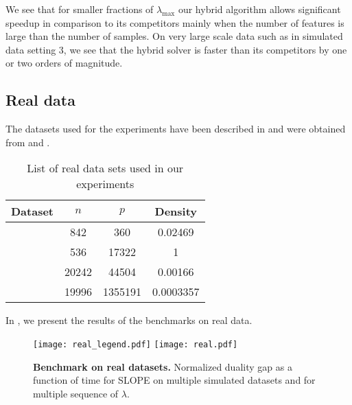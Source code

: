 We see that for smaller fractions of $\lambda_{\text{max}}$ our hybrid algorithm allows significant speedup in comparison to its competitors mainly when the number of features is large than the number of samples.
On very large scale data such as in simulated data setting $3$, we see that the hybrid solver is faster than its competitors by one or two orders of magnitude.

\subsection{Real data}
\label{sec:experiments-real-data}

The datasets used for the experiments have been described in  and were obtained from \textcite{chang2011,chang2016} and \textcite{breheny2022}.

\begin{table}[hbt]
  \centering
  \caption{List of real data sets used in our experiments}
  \label{tab:real-data}
  \begin{tabular}{
      l
      S[table-format=5.0,round-mode=off]
      S[table-format=7.0,round-mode=off]
      S[table-format=1.5,round-mode=figures,round-precision=2]
    }
    \toprule
    Dataset            & \(n\) & \(p\)   & {Density} \\ \midrule
     & 842   & 360     & 0.02469   \\
       & 536   & 17322   & 1         \\
         & 20242 & 44504   & 0.00166   \\
       & 19996 & 1355191 & 0.0003357 \\ \bottomrule
  \end{tabular}
\end{table}

In , we present the results of the benchmarks on real data.

\begin{figure*}[!t]
  \centering
  \texttt{[image: real\_legend.pdf]}
  \texttt{[image: real.pdf]}
  \caption{\textbf{Benchmark on real datasets.} Normalized duality gap as a function of time for SLOPE on multiple simulated datasets and for multiple sequence of $\lambda$.}
  \label{fig:real-data}
\end{figure*}

